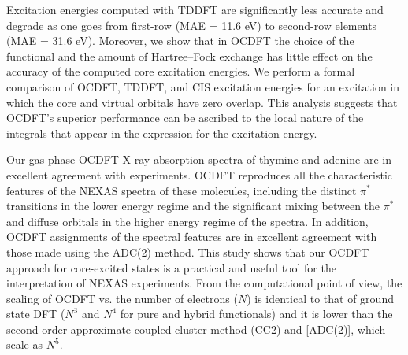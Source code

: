 \documentclass[12pt]{article}
\begin{document}
Excitation energies computed with TDDFT are significantly less accurate and degrade as one goes from first-row (MAE = 11.6 eV) to second-row elements (MAE = 31.6 eV).
Moreover, we show that in OCDFT the choice of the functional and the amount of Hartree--Fock exchange has little effect on the accuracy of the computed core excitation energies.
We perform a formal comparison of OCDFT, TDDFT, and CIS excitation energies for an excitation in which the core and virtual orbitals have zero overlap.
This analysis suggests that OCDFT's superior performance can be ascribed to the local nature of the integrals that appear in the expression for the excitation energy.

Our gas-phase OCDFT X-ray absorption spectra of thymine and adenine are in excellent agreement with experiments. 
OCDFT reproduces all the characteristic features of the NEXAS spectra of these molecules,\cite{plekan_theoretical_2008,wenzel_calculating_2014} including the distinct $\pi^*$ transitions in the lower energy regime and the significant mixing between the $\pi^*$ and diffuse orbitals in the higher energy regime of the spectra.
In addition, OCDFT assignments of the spectral features are in excellent agreement with those made using the ADC(2) method.\cite{plekan_theoretical_2008}
This study shows that our OCDFT approach for core-excited states is a practical and useful tool for the interpretation of NEXAS experiments. 
From the computational point of view, the scaling of OCDFT vs. the number of electrons ($N$) is identical to that of ground state DFT ($N^3$ and $N^4$ for pure and hybrid functionals) and it is lower than the second-order approximate coupled cluster method (CC2)\cite{christiansen_cc2_1995} and [ADC(2)], which scale as $N^5$.
\end{document}

